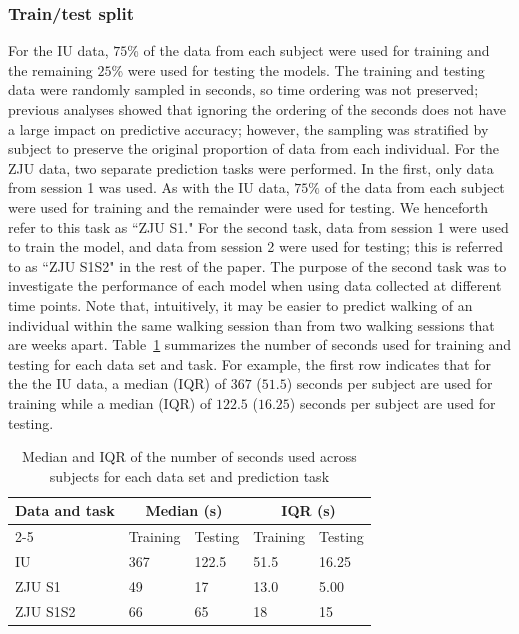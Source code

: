 \subsubsection{Train/test split}
For the IU data, $75$\% of the data from each subject were used for training and the remaining $25$\% were used for testing the models. The training and testing data were randomly sampled in seconds, so time ordering was not preserved; previous analyses \cite{koffman_fingerprinting_2023} showed that ignoring the ordering of the seconds does not have a large impact on predictive accuracy; however, the sampling was stratified by subject to preserve the original proportion of data from each individual. For the ZJU data, two separate prediction tasks were performed. In the first, only data from session 1 was used. As with the IU data, $75\%$ of the data from each subject were used for training and the remainder were used for testing. We henceforth refer to this task as ``ZJU S1." For the second task, data from session 1 were used to train the model, and data from session 2 were used for testing; this is referred to as ``ZJU S1S2" in the rest of the paper. The purpose of the second task was to investigate the performance of each model when using data collected at different time points. Note that, intuitively, it may be easier to predict walking of an individual within the same walking session than from two walking sessions that are weeks apart. Table~\ref{tab:train_test_seconds} summarizes the number of seconds used for training and testing for each data set and task. For example, the first row indicates that for the  the IU data, a median (IQR) of $367$ ($51.5$) seconds per subject are used for training while a median (IQR) of $122.5$ ($16.25$) seconds per subject are used for testing. 

\begin{table}[ht]

\centering 
\caption{Median and IQR of the number of seconds used across subjects for each data set and prediction task}
\label{tab:train_test_seconds}
\begin{tabular}{|l|ll|ll|}
\hline
\multicolumn{1}{|c|}{\multirow{2}{*}{Data and task}} & \multicolumn{2}{c|}{Median (s)}         & \multicolumn{2}{c|}{IQR (s)}            \\ \cline{2-5} 
\multicolumn{1}{|c|}{}                               & \multicolumn{1}{l|}{Training} & Testing & \multicolumn{1}{l|}{Training} & Testing \\ \hline\hline
IU                                                   & \multicolumn{1}{l|}{367}      & 122.5   & \multicolumn{1}{l|}{51.5}     & 16.25   \\ \hline
ZJU S1                                               & \multicolumn{1}{l|}{49}       & 17      & \multicolumn{1}{l|}{13.0}     & 5.00    \\ \hline
ZJU S1S2                                             & \multicolumn{1}{l|}{66}       & 65      & \multicolumn{1}{l|}{18}       & 15      \\ \hline
\end{tabular}
\end{table}

